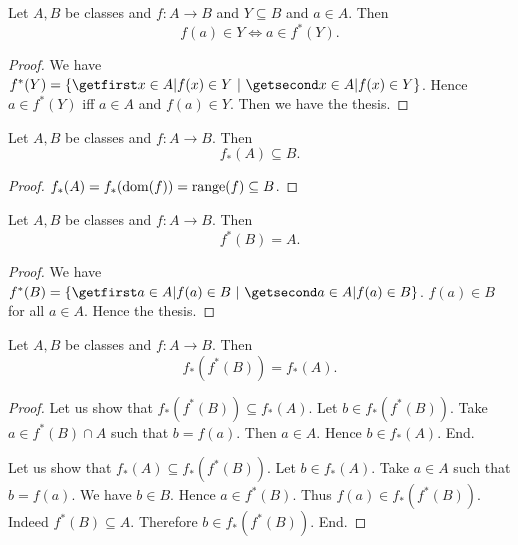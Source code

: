 \documentclass[../set-theory.tex]{subfiles}
\begin{document}
  \begin{forthel}
    \begin{proposition}
      Let $A, B$ be classes and $f : A \to B$ and $Y \subseteq B$ and $a \in A$.
      Then \[ f(a) \in Y \iff a \in f^{*}(Y). \]
    \end{proposition}
    \begin{proof}
      We have $f^{*}(Y) = \class{ x \in A | f(x) \in Y }$.
      Hence $a \in f^{*}(Y)$ iff $a \in A$ and $f(a) \in Y$.
      Then we have the thesis.
    \end{proof}
  \end{forthel}

  \begin{forthel}
    \begin{proposition}
      Let $A, B$ be classes and $f : A \to B$.
      Then \[ f_{*}(A) \subseteq B. \]
    \end{proposition}
    \begin{proof}
      $f_{*}(A) = f_{*}(\operatorname{dom}(f)) = \operatorname{range}(f) \subseteq B$.
    \end{proof}
  \end{forthel}

  \begin{forthel}
    \begin{proposition}
      Let $A, B$ be classes and $f : A \to B$.
      Then \[ f^{*}(B) = A. \]
    \end{proposition}
    \begin{proof}
      We have $f^{*}(B) = \class{ a \in A | f(a) \in B }$.
      $f(a) \in B$ for all $a \in A$.
      Hence the thesis.
    \end{proof}
  \end{forthel}

  \begin{forthel}
    \begin{proposition}
      Let $A, B$ be classes and $f : A \to B$.
      Then \[ f_{*}(f^{*}(B)) = f_{*}(A). \]
    \end{proposition}
    \begin{proof}
      Let us show that $f_{*}(f^{*}(B)) \subseteq f_{*}(A)$.
        Let $b \in f_{*}(f^{*}(B))$.
        Take $a \in f^{*}(B) \cap A$ such that $b = f(a)$.
        Then $a \in A$.
        Hence $b \in f_{*}(A)$.
      End.

      Let us show that $f_{*}(A) \subseteq f_{*}(f^{*}(B))$.
        Let $b \in f_{*}(A)$.
        Take $a \in A$ such that $b = f(a)$.
        We have $b \in B$.
        Hence $a \in f^{*}(B)$.
        Thus $f(a) \in f_{*}(f^{*}(B))$.
        Indeed $f^{*}(B) \subseteq A$.
        Therefore $b \in f_{*}(f^{*}(B))$.
      End.
    \end{proof}
  \end{forthel}
\end{document}
